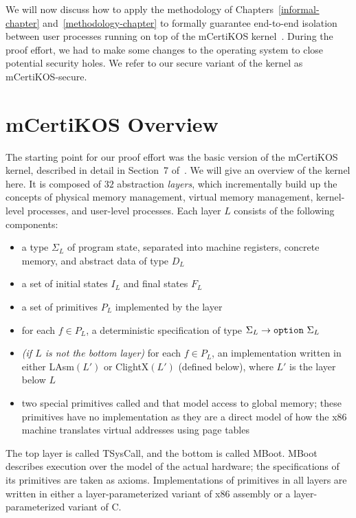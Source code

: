 \label{casestudy-def-chapter}

We will now discuss how to apply the methodology of
Chapters~\ref{informal-chapter} and~\ref{methodology-chapter} to
formally guarantee end-to-end isolation between user 
processes running on top of the mCertiKOS kernel~\cite{certikos-popl}. 
During the proof effort, we had to make some changes to the operating
system to close potential security holes. We refer to our secure 
variant of the kernel as mCertiKOS-secure.

\section{mCertiKOS Overview}

The starting point for our proof effort was the basic version of
the mCertiKOS kernel, described in detail in Section~7 
of~\cite{certikos-popl}. We will give an overview of the kernel
here. It is composed of $32$ abstraction \emph{layers},
which incrementally build up the concepts of physical memory
management, virtual memory management, kernel-level processes,
and user-level processes. Each layer $L$ consists of the
following components:
\begin{itemize}
\item a type $\Sigma_L$ of program state, separated into 
machine registers, concrete memory, and abstract data of type $D_L$
\item a set of initial states $I_L$ and final states $F_L$
\item a set of primitives $P_L$ implemented by the layer
\item for each $f \in P_L$, a deterministic specification of type
$\Sigma_L \to \text{\tt{option}} \,\, \Sigma_L$
\item \textit{(if $L$ is not the bottom layer)} for each  
$f \in P_L$, an implementation written
in either LAsm$(L')$ or ClightX$(L')$ (defined below), where 
$L'$ is the layer below $L$
\item two special primitives called  and 
that model access to global memory; these primitives have no 
implementation as they are a direct model of how the x86 machine
translates virtual addresses using page tables
\end{itemize}

The top layer is called TSysCall, and the bottom is called
MBoot. MBoot describes execution over the model of the actual hardware;
the specifications of its primitives are taken as axioms. Implementations
of primitives in all layers are written in either a layer-parameterized
variant of x86 assembly or a layer-parameterized variant of C. 

